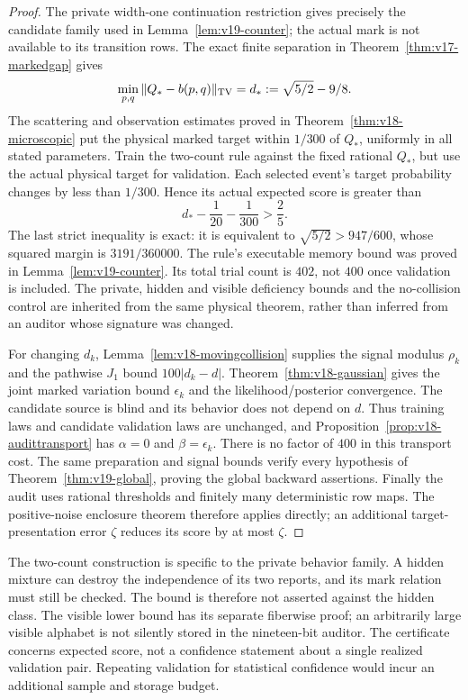 \begin{proof}
The private width-one continuation restriction gives precisely the
candidate family used in Lemma~\ref{lem:v19-counter}; the actual mark is
not available to its transition rows. The exact finite separation in
Theorem~\ref{thm:v17-markedgap} gives
\[
 \min_{p,q}\|Q_*-b(p,q)\|_{\rm TV}
             =d_*:=\sqrt{5/2}-9/8.
\]
The scattering and observation estimates proved in
Theorem~\ref{thm:v18-microscopic} put the physical marked target within
$1/300$ of $Q_*$, uniformly in all stated parameters. Train the two-count
rule against the fixed rational $Q_*$, but use the actual physical target
for validation. Each selected event's target probability changes by less
than $1/300$. Hence its actual expected score is greater than
\begin{equation}\label{eq:v19-physicalscore}
 d_*-\frac1{20}-\frac1{300}>\frac25.
\end{equation}
The last strict inequality is exact: it is equivalent to
$\sqrt{5/2}>947/600$, whose squared margin is $3191/360000$.
The rule's executable memory bound was proved in
Lemma~\ref{lem:v19-counter}. Its total trial count is $402$, not $400$
once validation is included. The private, hidden and visible deficiency
bounds and the no-collision control are inherited from the same physical
theorem, rather than inferred from an auditor whose signature was changed.

For changing $d_k$, Lemma~\ref{lem:v18-movingcollision} supplies the
signal modulus $\rho_k$ and the pathwise $J_1$ bound
$100|d_k-d|$. Theorem~\ref{thm:v18-gaussian} gives the joint marked
variation bound $\epsilon_k$ and the likelihood/posterior convergence.
The candidate source is blind and its behavior does not depend on $d$.
Thus training laws and candidate validation laws are unchanged, and
Proposition~\ref{prop:v18-audittransport} has $\alpha=0$ and
$\beta=\epsilon_k$. There is no factor of $400$ in this transport cost.
The same preparation and signal bounds verify every hypothesis of
Theorem~\ref{thm:v19-global}, proving the global backward assertions.
Finally the audit uses rational thresholds and finitely many deterministic
row maps. The positive-noise enclosure theorem therefore applies directly;
an additional target-presentation error $\zeta$ reduces its score by at
most $\zeta$.
\end{proof}

The two-count construction is specific to the private behavior family. A
hidden mixture can destroy the independence of its two reports, and its
mark relation must still be checked. The bound is therefore not asserted
against the hidden class. The visible lower bound has its separate
fiberwise proof; an arbitrarily large visible alphabet is not silently
stored in the nineteen-bit auditor. The certificate concerns expected
score, not a confidence statement about a single realized validation pair.
Repeating validation for statistical confidence would incur an additional
sample and storage budget.

